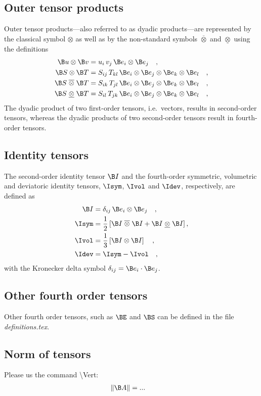 \subsection{Outer tensor products}
Outer tensor products---also referred to as dyadic products---are represented by the classical symbol $\otimes$ as well as by the non-standard symbols $\overline{\otimes}$ and $\underline{\otimes}$ using the definitions
\begin{align*}
	\B u \otimes \B v & = u_i\,v_j\, \B e_i \otimes \B e_j \quad,\\
	\B S \otimes \B T & = S_{ij}\,T_{kl}\, \B e_i \otimes \B e_j \otimes \B e_k \otimes \B e_l  \quad,\\
	\B S \;\overline{\otimes}  \; \B T & = S_{ik}\,T_{jl}\, \B e_i \otimes \B e_j \otimes \B e_k \otimes \B e_l  \quad,\\
	\B S \;\underline{\otimes} \; \B T & = S_{il}\,T_{jk}\, \B e_i \otimes \B e_j \otimes \B e_k \otimes \B e_l  \quad,\\
\end{align*}
The dyadic product of two first-order tensors, i.e.~vectors, results in second-order tensors, whereas the dyadic products of two second-order tensors result in fourth-order tensors.


\subsection{Identity tensors}
The second-order identity tensor $\B I$ and the fourth-order symmetric, volumetric and deviatoric identity tensors, $\Isym$, $\Ivol$ and $\Idev$, respectively, are defined as
\begin{align*}
	\B I     & = \delta_{ij} \, \B e_i \otimes \B e_j   \quad,\\
	\Isym & = \frac{1}{2}\left[ \B I \;\overline{\otimes}  \; \B I + \B I \;\underline{\otimes}  \; \B I \right]  ,\\
	\Ivol & = \frac{1}{3}\left[ \B I \otimes \B I \right] \quad, \\
	\Idev & = \Isym - \Ivol \quad,  
\end{align*}
with the Kronecker delta symbol $\delta_{ij} = \B e_i \cdot \B e_j$.



\subsection{Other fourth order tensors}
Other fourth order tensors, such as $\BE$ and $\BS$ can be defined in the file \emph{definitions.tex}.



\subsection{Norm of tensors}
Please us the command \textbackslash Vert:
\begin{align*}
	\Vert \B A \Vert & = ...
\end{align*}







